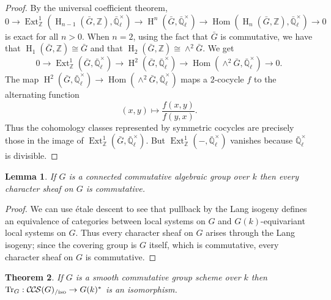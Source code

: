\documentclass[10pt]{amsart}
\theoremstyle{plain}
\newtheorem{theorem}{Theorem}[section]
\newtheorem{lemma}[theorem]{Lemma}
\theoremstyle{definition}
\newcommand{\ZZ}{{\mathbb{Z}}}
\newcommand{\EE}{\mathbb{\bar Q}_\ell}
\newcommand{\Fq}{k}
\newcommand{\EEx}{\EE^\times}
\DeclareMathOperator{\Hom}{Hom}
\DeclareMathOperator{\Ext}{Ext}
\DeclareMathOperator{\Hh}{H}
\newcommand{\TrFrob}[1]{\operatorname{Tr}_{#1}}
\newcommand{\CCS}{{\mathcal{C\hskip-.8pt C\hskip-0.8pt S}}}
\newcommand{\CCSiso}[1]{\CCS(#1)_{/\text{iso}}}
\newcommand{\bG}{\bar{G}}
\begin{document}
\begin{proof}
By the universal coefficient theorem,
\[
0 \to \Ext^1_\ZZ(\Hh_{n-1}(\bG, \ZZ), \EEx) \to \Hh^n(\bG, \EEx) \to \Hom(\Hh_n(\bG, \ZZ), \EEx) \to 0
\]
is exact for all $n > 0$.  When $n = 2$, using the fact that $\bG$ is commutative, we have that $\Hh_1(\bG, \ZZ) \cong \bG$
and that $\Hh_2(\bG, \ZZ) \cong \wedge^2 \bG$. We get
\[
0 \to \Ext^1_\ZZ(\bG, \EEx) \to \Hh^2(\bG, \EEx) \to \Hom(\wedge^2 \bG, \EEx) \to 0.
\]
The map $\Hh^2(\bG, \EEx) \to \Hom(\wedge^2 \bG, \EEx)$ maps a $2$-cocycle $f$ to the alternating function
\[
(x,y) \mapsto \frac{f(x,y)}{f(y,x)}.
\]
Thus the cohomology classes represented by symmetric cocycles are precisely those in the image of $\Ext^1_\ZZ(\bG, \EEx)$.
But $\Ext^1_\ZZ(-, \EEx)$ vanishes because $\EEx$ is divisible.
\end{proof}



\begin{lemma} \label{lem:conncomm}
If $G$ is a connected commutative algebraic group over $\Fq$ then every character sheaf on $G$ is commutative.
\end{lemma}

\begin{proof}
We can use \'etale descent to see that pullback by the Lang isogeny defines an equivalence
of categories between local systems on $G$ and $G(\Fq)$-equivariant local systems on $G$.  Thus every character
sheaf on $G$ arises through the Lang isogeny; since the covering group is $G$ itself, which is commutative,
every character sheaf on $G$ is commutative.
\end{proof}

\begin{theorem} \label{thm:trfrobiso}
If $G$ is a smooth commutative group scheme over $\Fq$ then $\TrFrob{G} : \CCSiso{G} \to G(\Fq)^*$ is an isomorphism.
\end{theorem}
\end{document}
